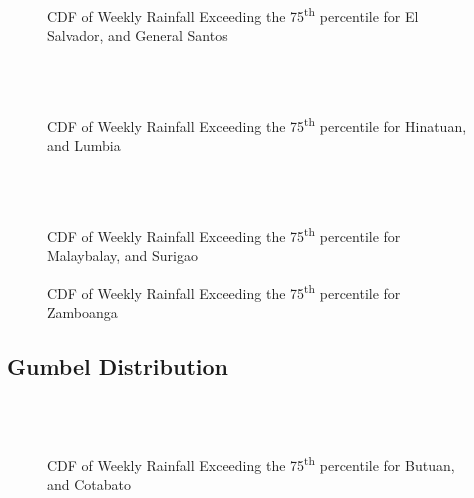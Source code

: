\begin{figure}[H]
  \centering 
  \\
  \caption{CDF of Weekly Rainfall Exceeding the 75\textsuperscript{th} percentile for El Salvador, and General Santos}
  \label{fig:weekly_0.75_appendix_gpd_pt3}
\end{figure}

\begin{figure}[H]
  \centering
  \\
  \\
\caption{CDF of Weekly Rainfall Exceeding the 75\textsuperscript{th} percentile for Hinatuan, and Lumbia}
  \label{fig:weekly_0.75_appendix_gpd_pt4}
\end{figure}

\begin{figure}[H]
  \centering
  \\
  \\
\caption{CDF of Weekly Rainfall Exceeding the 75\textsuperscript{th} percentile for Malaybalay, and Surigao}
  \label{fig:weekly_0.75_appendix_gpd_pt5}
\end{figure}

\begin{figure}[H]
  \centering
  \caption{CDF of Weekly Rainfall Exceeding the 75\textsuperscript{th} percentile for Zamboanga}
  \label{fig:weekly_0.75_appendix_gpd_pt6}
\end{figure}

\subsection{Gumbel Distribution}

\begin{figure}[H]
  \centering
  \\
  \\
\caption{CDF of Weekly Rainfall Exceeding the 75\textsuperscript{th} percentile for Butuan, and Cotabato}
  \label{fig:weekly_0.75_appendix_gb_pt1}
\end{figure}

